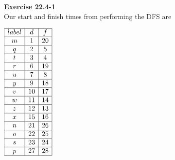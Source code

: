 \documentclass{article}
\begin{document}
\begin{comment}
Samir Khuller reveals through personal communication with Cormen that at the time of writing, the best solution known to Cormen takes time $O(|V||E|)$. This is mentioned in his paper ``An O(|V|^2) algorithm for single connectedness''. We here present an even better algorithm which only takes time $O(|E|+|V|\alpha(|V|))$.

First, we check for the graph to be acyclic. This can be done with a DFS looking for black edges, as proven in lemma 22.11. Once we know it is  acyclic, we perform a topological sort. Both of these steps take time $O(|V|+|E|)$. Then, to check for single connectedness, we create a disjoint set structure in which each vertex is in its own set. Then, looking at the vertices from left to right in the topological sort, we will union together all the children of the vertex under consideration. Before this though, we check to make sure that the vertex under consideration is in a different set than all of its children. If we had that the current object were in the same set as it's children that means that there is some ancestor of the current vertex that is also a parent of the current vertex's child. This would mean that there are two paths from that ancestor to the child. One that's direct, and one that passes through the current vertex.\end{comment}


\noindent\textbf{Exercise 22.4-1}\\
Our start and finish times from performing the DFS are

\begin{center}
$
\begin{array}{|c|c|c|}
\hline
label & d&f\\
\hline
m&1&20\\
\hline
q&2&5\\
\hline
t&3&4\\
\hline
r&6&19\\
\hline
u&7&8\\
\hline
y&9&18\\
\hline
v&10&17\\
\hline
w&11&14\\
\hline
z&12&13\\
\hline
x&15&16\\
\hline
n&21&26\\
\hline
o&22&25\\
\hline
s&23&24\\
\hline
p&27&28\\
\hline
\end{array}
$
\end{center}
\end{document}
